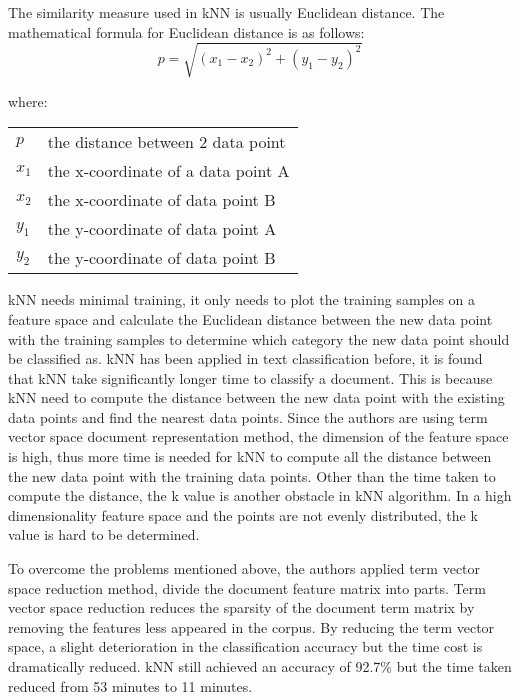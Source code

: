 The similarity measure used in kNN is usually Euclidean distance. The mathematical formula for Euclidean distance is as follows:
\begin{equation}
p = \sqrt{(x_{1} - x_{2})^{2} + (y_{1} - y_{2})^{2}}
\end{equation}

where:
\begin{center}
	\begin{tabular}{l @{ $=$ } l}
		$p$ & the distance between 2 data point\\
		$x_{1}$ & the x-coordinate of a data point A\\
		$x_{2}$ & the x-coordinate of data point B\\
		$y_{1}$ & the y-coordinate of data point A\\
		$y_{2}$ & the y-coordinate of data point B\\
	\end{tabular}
\end{center}
	

kNN needs minimal training, it only needs to plot the training samples on a feature space and calculate the Euclidean distance between the new data point with the training samples to determine which category the new data point should be classified as. kNN has been applied in text classification before, it is found that kNN take significantly longer time to classify a document. This is because kNN need to compute the distance between the new data point with the existing data points and find the nearest data points. Since the authors are using term vector space document representation method, the dimension of the feature space is high, thus more time is needed for kNN to compute all the distance between the new data point with the training data points. Other than the time taken to compute the distance, the k value is another obstacle in kNN algorithm. In a high dimensionality feature space and the points are not evenly distributed, the k value is hard to be determined.

To overcome the problems mentioned above, the authors applied term vector space reduction method, divide the document feature matrix into parts. Term vector space reduction reduces 
the sparsity of the document term matrix by removing the features less appeared in the corpus. By reducing the term vector space, a slight deterioration in the classification accuracy but the time cost is dramatically reduced. kNN still achieved an accuracy of 92.7\% but the time taken reduced from 53 minutes to 11 minutes. \cite{knnVectorSpaceReduction}

